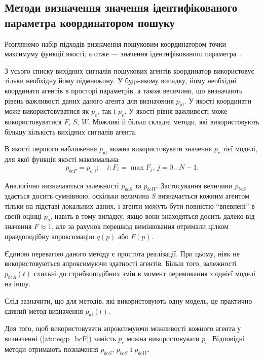 \subsection{Методи визначення значення ідентифікованого параметра координатором пошуку} %


Розглянемо набір підходів визначення пошуковим координатором точки максимуму
функції якості, а отже --- значення ідентифікованого
параметра~\cite{atu_st99,atu_jacs2015,atu_st103}.


З усього списку вихідних сигналів пошукових агентів координатор використовує
тільки необхідну йому підмножину.
У будь-якому випадку, йому необхідні координати агентів в
просторі параметрів, а також величини, що визначають рівень
важливості даних даного агента для визначення
$p_\mathrm{id}$.
У якості координати може використовуватися як $p_c$, так і $p_e$.
У якості рівня важливості може використовуватися $F$, $S$, $W$.
Можливі й більш складні методи, які використовують більшу
кількість вихідних сигналів агента.

В якості першого наближення $p_\mathrm{id}$ можна  використовувати
значення $p_c$ тієї моделі, для якої функція якості максимальна:
%
\begin{equation}
  p_{bcF}
  =
  p_{c,i};
  \quad
  i : F_i = \max{F_j}, \, j=0 \ldots N-1 .
  \label{atu:eq:p_bcF}
\end{equation}

Аналогічно визначаються залежності
$p_{bcS}$ та $p_{bcW}$.
%
Застосування величини
$p_{bcS}$ здається досить сумнівною, оскільки величина
$S$ визначається кожним агентом тільки на підставі локальних
даних, і агенти можуть бути повністю ``впевнені'' в своїй оцінці
$p_o$, навіть в тому випадку, якщо вони знаходяться досить далеко
від значення
$F \approx 1$, але за рахунок перешкод вимінювання отримали цілком
правдоподібну апроксимацію
$q(p)$ або
$F(p)$.

Єдиною перевагою даного методу є простота реалізації. При цьому, ніяк не
використовуються апроксимуючи здатності агентів. Більш того, залежності
$p_{bcA}(t)$ схильні до стрибкоподібних змін в момент перемикання з однієї моделі
на іншу.

Слід зазначити, що для методів, які використовують одну модель, це
практично єдиний метод визначення
$p_\mathrm{id}(t)$.

Для того, щоб використовувати апроксимуючи можливості кожного агента у
визначенні (\ref{atu:eq:p_bcF}) замість $p_c$ можна використовувати $ p_e$.
Відповідні методи отримають позначення $p_{beS}$, $p_{beS} $ і $p_{beW}$.

